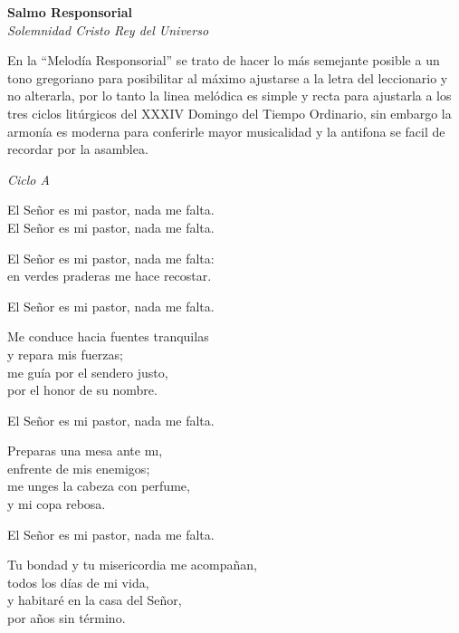 \documentclass[12pt, letterpaper]{report}
\begin{document}
    {%
\parindent 0pt
\noindent
\ifx\preLilyPondExample \undefined
\else
  \expandafter\preLilyPondExample
\fi
\def\lilypondbook{}%
%
\ifx\postLilyPondExample \undefined
\else
  \expandafter\postLilyPondExample
\fi
}
    \clearpage

    \begin{center}
      \LARGE \textbf{Salmo Responsorial}\\
      \Large \textit{Solemnidad Cristo Rey del Universo}
    \end{center}

    \Large En la ``Melod\'ia Responsorial'' se trato de hacer lo m\'as semejante posible a un tono gregoriano para posibilitar al m\'aximo ajustarse a la letra del leccionario y no alterarla, por lo tanto la linea mel\'odica es simple y recta para ajustarla a los tres ciclos litúrgicos del XXXIV Domingo del Tiempo Ordinario, sin embargo la armon\'ia es moderna para conferirle mayor musicalidad y la antifona se facil de recordar por la asamblea.

    \LARGE \textit{Ciclo A}

    \noindent
    \LARGE El Se\~nor es mi pastor, nada me falta.\\
    El Se\~nor es mi pastor, nada me falta.

    \noindent
    El Se\~nor es mi pastor, nada me falta:\\
    en verdes praderas me hace recostar.

    \noindent
    El Se\~nor es mi pastor, nada me falta.

    \noindent
    Me conduce hacia fuentes tranquilas\\
    y repara mis fuerzas;\\
    me gu\'ia por el sendero justo,\\
    por el honor de su nombre.

    \noindent
    El Se\~nor es mi pastor, nada me falta.

    \noindent
    Preparas una mesa ante m\i,\\
    enfrente de mis enemigos;\\
    me unges la cabeza con perfume,\\
    y mi copa rebosa.

    \noindent
    El Se\~nor es mi pastor, nada me falta.

    \noindent
    Tu bondad y tu misericordia me acompa\~nan,\\
    todos los d\'ias de mi vida,\\
    y habitar\'e en la casa del Se\~nor,\\
    por a\~nos sin t\'ermino.
\end{document}
